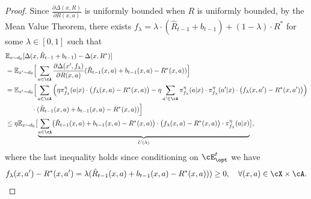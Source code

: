\documentclass[11pt]{article}
\newcommand{\rE}{\mathbb E}
\begin{document}
\begin{proof}
Since $\frac{\partial \Delta(x,R)}{\partial R(x,a)}$ is uniformly bounded when $R$ is uniformly bounded, by the Mean Value Theorem, there exists $f_\lambda = \lambda \cdot (\hat R_{t - 1} + b_{t - 1}) + (1 - \lambda) \cdot R^*$ for some $\lambda \in [0, 1]$ such that 
\begin{align} 
    &\rE_{x \sim d_0}[\Delta(x, \hat R_{t - 1} + b_{t - 1}) - \Delta(x, R^*)]  \notag
    \\&= \rE_{x' \sim d_0}\Big[\sum_{a\in\cA}\frac{\partial \Delta(x',f_\lambda)}{\partial R(x,a)}(\hat R_{t - 1}(x, a) + b_{t - 1}(x, a)-R^*(x,a))\Big] \notag
    \\&= \rE_{x' \sim d_0}\Big[\sum_{a\in\cA}\Big(\eta \pi_{f_\lambda}^\eta(a|x) \cdot \big(f_\lambda(x,a) - R^*(x,a)\big)  - \eta \sum_{a' \in \cA} \pi_{f_\lambda}^\eta(a|x) \cdot \pi_{f_\lambda}^\eta(a'|x) \cdot \big(f_\lambda(x,a') - R^*(x,a')\big)\Big)\notag
    \\&\qquad\qquad \cdot(\hat R_{t - 1}(x, a) + b_{t - 1}(x, a)-R^*(x,a))\Big] \notag
    \\&\le \eta \rE_{x \sim d_0} \bigl[\underbrace{\sum_{a \in \cA} \bigl(\hat R_{t - 1}(x, a) + b_{t - 1}(x, a) - R^*(x, a)\bigr) \cdot \bigl(f_\lambda(x, a) - R^*(x, a)\bigr) \cdot \pi_{f_\lambda}^\eta(a|x)}_{U(\lambda)}\bigr], \label{eq:mean-value}
\end{align}
where the last inequality holds since conditioning on $\cE_{\opt}^t$ we have 
\begin{align*}
    f_\lambda(x,a') - R^*(x,a') = \lambda(\hat R_{t - 1}(x, a) + b_{t - 1}(x, a)-R^*(x,a))) \ge 0,\quad \forall(x,a)\in\cX\times\cA.
\end{align*}



\end{proof}
\end{document}

